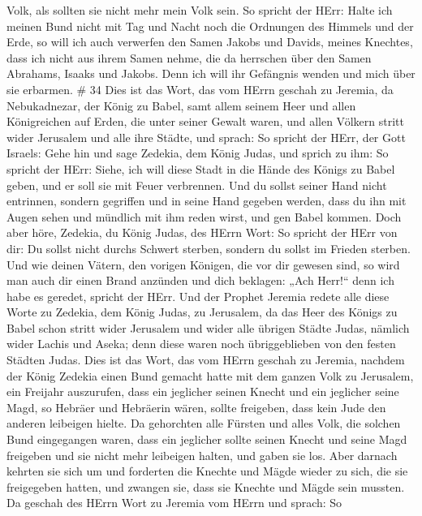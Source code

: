 Volk, als sollten sie nicht mehr mein Volk sein.  So
spricht der HErr: Halte ich meinen Bund nicht mit Tag und Nacht noch die
Ordnungen des Himmels und der Erde,  so will ich auch
verwerfen den Samen Jakobs und Davids, meines Knechtes, dass ich nicht
aus ihrem Samen nehme, die da herrschen über den Samen Abrahams, Isaaks
und Jakobs. Denn ich will ihr Gefängnis wenden und mich über sie
erbarmen. \# 34  Dies ist das Wort, das vom HErrn geschah zu
Jeremia, da Nebukadnezar, der König zu Babel, samt allem seinem Heer und
allen Königreichen auf Erden, die unter seiner Gewalt waren, und allen
Völkern stritt wider Jerusalem und alle ihre Städte, und sprach:
 So spricht der HErr, der Gott Israels: Gehe hin und sage
Zedekia, dem König Judas, und sprich zu ihm: So spricht der HErr: Siehe,
ich will diese Stadt in die Hände des Königs zu Babel geben, und er soll
sie mit Feuer verbrennen.  Und du sollst seiner Hand nicht
entrinnen, sondern gegriffen und in seine Hand gegeben werden, dass du
ihn mit Augen sehen und mündlich mit ihm reden wirst, und gen Babel
kommen.  Doch aber höre, Zedekia, du König Judas, des HErrn
Wort: So spricht der HErr von dir: Du sollst nicht durchs Schwert
sterben,  sondern du sollst im Frieden sterben. Und wie
deinen Vätern, den vorigen Königen, die vor dir gewesen sind, so wird
man auch dir einen Brand anzünden und dich beklagen: „Ach Herr!{}`` denn
ich habe es geredet, spricht der HErr.  Und der Prophet
Jeremia redete alle diese Worte zu Zedekia, dem König Judas, zu
Jerusalem,  da das Heer des Königs zu Babel schon stritt
wider Jerusalem und wider alle übrigen Städte Judas, nämlich wider
Lachis und Aseka; denn diese waren noch übriggeblieben von den festen
Städten Judas.  Dies ist das Wort, das vom HErrn geschah zu
Jeremia, nachdem der König Zedekia einen Bund gemacht hatte mit dem
ganzen Volk zu Jerusalem, ein Freijahr auszurufen,  dass ein
jeglicher seinen Knecht und ein jeglicher seine Magd, so Hebräer und
Hebräerin wären, sollte freigeben, dass kein Jude den anderen leibeigen
hielte.  Da gehorchten alle Fürsten und alles Volk, die
solchen Bund eingegangen waren, dass ein jeglicher sollte seinen Knecht
und seine Magd freigeben und sie nicht mehr leibeigen halten, und gaben
sie los.  Aber darnach kehrten sie sich um und forderten
die Knechte und Mägde wieder zu sich, die sie freigegeben hatten, und
zwangen sie, dass sie Knechte und Mägde sein mussten.  Da
geschah des HErrn Wort zu Jeremia vom HErrn und sprach:  So
